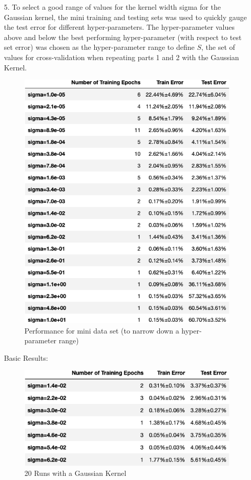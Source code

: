 \documentclass[12pt]{article}
\begin{document}
\begin{itemize}
    \item[5.] To select a good range of values for the kernel width sigma for the Gaussian kernel, the mini training and testing sets was used to quickly gauge the test error for different hyper-parameters.
    The hyper-parameter values above and below the best performing hyper-parameter (with respect to test set error) was chosen as the hyper-parameter range to define $S$, the set of values for cross-validation when repeating parts 1 and 2 with the Gaussian Kernel.
    \begin{figure}[h]
    \centering
    \includegraphics[scale=0.5]{outputs/part1/q5_1-mini.png}
    \caption{Performance for mini data set (to narrow down a hyper-parameter range)}
    \label{fig:7}
    \end{figure}
    \newpage

    Basic Results:

    \begin{figure}[h]
    \centering
    \includegraphics[scale=0.5]{outputs/part1/q5_1.png}
    \caption{20 Runs with a Gaussian Kernel}
    \label{fig:8}
    \end{figure}



\end{itemize}
\end{document}
